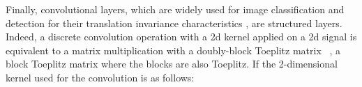


%


%
%


Finally, convolutional layers, which are widely used for image classification and detection for their translation invariance characteristics \cite{zhang1990parallel}, are structured layers.
Indeed, a discrete convolution operation with a 2d kernel applied on a 2d signal is equivalent to a matrix multiplication with a doubly-block Toeplitz matrix~\cite{jain1989fundamentals} \ie, a block Toeplitz matrix where the blocks are also Toeplitz.
If the 2-dimensional kernel used for the convolution is as follows:

